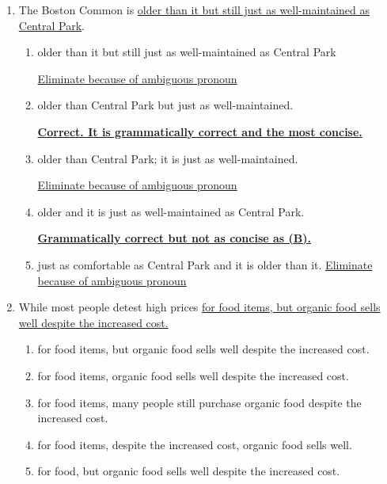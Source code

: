 \begin{enumerate}
\item The Boston Common is \ul{older than it but still just as well-maintained as Central Park}.
\begin{enumerate}[label=(\Alph*)]
\item older than it but still just as well-maintained as Central Park 

  \ul{Eliminate because of ambiguous pronoun}
  
\item older than Central Park but just as well-maintained. 

\textbf{\ul{Correct. It is grammatically correct and the most concise.}}

\item  older than Central Park; it is just as well-maintained.   

  \ul{Eliminate because of ambiguous pronoun}
  
\item older and it is just as well-maintained as Central Park. 

\textbf{\ul{Grammatically correct but not as concise as (B).}}

\item just as comfortable as Central Park and it is older than it. \ul{Eliminate because of ambiguous pronoun}

\end{enumerate}

\bigskip
\item While most people detest high prices \ul{for food items, but organic food sells well despite the increased cost.}

\bigskip
\begin{enumerate}[label=(\Alph*)]
\item for food items, but organic food sells well despite the increased cost. \hrulefill
 
\item for food items, organic food sells well despite the increased cost. \hrulefill
 
\item for food items, many people still purchase organic food despite the increased cost. \hrulefill

\item for food items, despite the increased cost, organic food sells well. \hrulefill
 
\item for food, but organic food sells well despite the increased cost. \hrulefill


\end{enumerate}
\end{enumerate}
